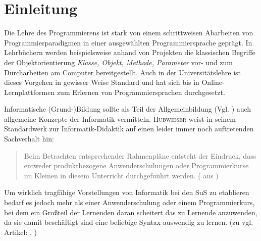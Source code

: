 \documentclass[paper=a4, DIV=13, BCOR=12mm, twoside=on, onecolumn=on, open = any, titlepage =on, parskip =half-, headsepline = on, footsepline = on, chapterprefix = on, sectionprefix = on, appendixprefix = off, fontsize = 11pt, numbers = noenddot, abstract = off]{scrreprt}
\begin{document}
\newpage
\thispagestyle{plain}




\thispagestyle{empty}
\newpage
\thispagestyle{empty}

%
%
{}
\newcommand{\hsp}{\hspace{20pt}}
\titleformat{\chapter}[hang]{\Large\bfseries}{\thechapter\hsp\textcolor{gray75}{|}\hsp}{0pt}{\Large\bfseries}

\tableofcontents
\cleardoublepage
{}
\par \singlespacing
\renewcommand*{\dictumwidth}{.6667\textwidth}
\chapter{Einleitung}
\label{sec:einleitung}
\onehalfspacing


Die Lehre des Programmierens ist stark von einem schrittweisen Abarbeiten von Programmierparadigmen in einer ausgewählten Programmiersprache geprägt. In Lehrbüchern werden beispielsweise anhand von Projekten die klassischen Begriffe der Objektorientierung \emph{Klasse, Objekt, Methode, Parameter} vor- und zum Durcharbeiten am Computer bereitgestellt. Auch in der Universitätslehre ist dieses Vorgehen in gewisser Weise Standard und hat sich bis in Online-Lernplattformen zum Erlernen von Programmiersprachen durchgesetzt. 

Informatische (Grund-)Bildung sollte als Teil der Allgemeinbildung (Vgl. \cite{breier:94}) auch allgemeine Konzepte der Informatik vermitteln. \textsc{Hubwieser} weist in seinem Standardwerk zur Informatik-Didaktik auf einen leider immer noch auftretenden Sachverhalt hin:
\begin{quote}
Beim Betrachten entsprechender Rahmenpläne entsteht der Eindruck, dass entweder produktbezogene Anwenderschulungen oder Programmierkurse im Kleinen in diesem Unterricht durchgefuührt werden. (\cite[S.40]{hubwieser:07} aus \cite{koerber:93})
\end{quote}
Um wirklich tragfähige Vorstellungen von Informatik bei den SuS zu etablieren bedarf es jedoch mehr als einer Anwenderschulung oder einem Programmierkurs, bei dem ein Großteil der Lernenden daran scheitert  das zu Lernende anzuwenden, da sie damit beschäftigt sind eine beliebige Syntax auswendig zu lernen. (zu vgl. Artikel: \cite{humbert:02}, \cite{modrow:11})
\end{document}
